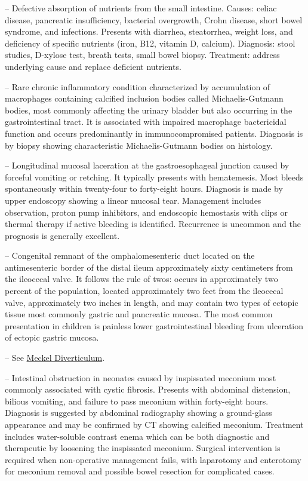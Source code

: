 -- Defective absorption of nutrients from the small intestine. Causes: celiac disease, pancreatic insufficiency, bacterial overgrowth, Crohn disease, short bowel syndrome, and infections. Presents with diarrhea, steatorrhea, weight loss, and deficiency of specific nutrients (iron, B12, vitamin D, calcium). Diagnosis: stool studies, D-xylose test, breath tests, small bowel biopsy. Treatment: address underlying cause and replace deficient nutrients.

-- Rare chronic inflammatory condition characterized by accumulation of macrophages containing calcified inclusion bodies called Michaelis-Gutmann bodies, most commonly affecting the urinary bladder but also occurring in the gastrointestinal tract. It is associated with impaired macrophage bactericidal function and occurs predominantly in immunocompromised patients. Diagnosis is by biopsy showing characteristic Michaelis-Gutmann bodies on histology.

-- Longitudinal mucosal laceration at the gastroesophageal junction caused by forceful vomiting or retching. It typically presents with hematemesis. Most bleeds spontaneously within twenty-four to forty-eight hours. Diagnosis is made by upper endoscopy showing a linear mucosal tear. Management includes observation, proton pump inhibitors, and endoscopic hemostasis with clips or thermal therapy if active bleeding is identified. Recurrence is uncommon and the prognosis is generally excellent.

-- Congenital remnant of the omphalomesenteric duct located on the antimesenteric border of the distal ileum approximately sixty centimeters from the ileocecal valve. It follows the rule of twos: occurs in approximately two percent of the population, located approximately two feet from the ileocecal valve, approximately two inches in length, and may contain two types of ectopic tissue most commonly gastric and pancreatic mucosa. The most common presentation in children is painless lower gastrointestinal bleeding from ulceration of ectopic gastric mucosa.

-- See \hyperlink{Meckel Diverticulum}{Meckel Diverticulum}.

-- Intestinal obstruction in neonates caused by inspissated meconium most commonly associated with cystic fibrosis. Presents with abdominal distension, bilious vomiting, and failure to pass meconium within forty-eight hours. Diagnosis is suggested by abdominal radiography showing a ground-glass appearance and may be confirmed by CT showing calcified meconium. Treatment includes water-soluble contrast enema which can be both diagnostic and therapeutic by loosening the inspissated meconium. Surgical intervention is required when non-operative management fails, with laparotomy and enterotomy for meconium removal and possible bowel resection for complicated cases.

